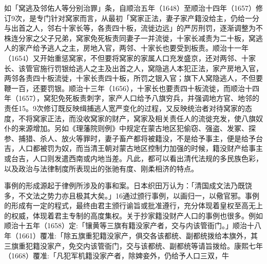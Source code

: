 \vfill
\begin{BookNotes}
\end{BookNotes}

\noindent 如「窝逃及邻佑人等分别治罪」条，自顺治五年（1648）至顺治十四年（1657）修订9次，是专门针对窝家而言，从最初「窝家正法，妻子家产籍没给主，仍给一分与出首之人，邻右十家长等，各责四十板，流徙边远」的严厉刑罚，逐渐调整为不株连分家之父子兄弟，窝家免死板责同妻子一并流徙，十家长减责为二十板，窝逃人的家产给予逃人之主，房地入官，两邻、十家长也要受到板责。顺治十一年（1654）又开始重惩窝家，不但要将窝家的家属人口充发盛京，还对两邻、十家长、该管官施行罚银给逃人之主及出首之人，窝隐逃人本犯正法，家产房地入官，两邻各责四十板流徙，十家长责四十板，所罚之银入官；旗下人窝隐逃人，不但要鞭一百，还要罚银。顺治十三年（1656），十家长也要责四十板流徙，而顺治十四年（1657），窝犯免死板责刺字，家产人口给予八旗穷兵，并强调地方官、地邻的责任15。9次修订既反映缉捕逃人宽严变化的过程，又反映统治者对待窝家的态度，不将窝家正法，而没收窝家的财产，窝家及相关责任人的流徙充发，使八旗奴仆的来源增加。另如《理藩院则例》中规定在蒙古地区犯偷窃、强盗、发冢、探参、捕猎、杀人、放火等罪时，妻子畜产都将被籍没，不是给予事主，便是给予台吉，人口都被罚为奴，而当清王朝对蒙古地区控制力加强的时候，籍没财产给事主或台吉，人口则发遣西南或内地当差。凡此，都可以看出清代法规的多民族色彩，以及政治与法律制度所表现出的张驰有度、刚柔相济的特点。

事例的形成源起于律例所涉及的事和案。日本织田万认为：「清国成文法乃既饶多，不文法之势力亦且极其大矣。」16通过颁行事例，以画归一，以儆官邪。事例的形成有一定的程式，最终由君主颁行谕旨或批准遵行，充分体现着皇权至高无上的权威，体现着君主专制的高度集权。关于抄家籍没财产人口的事例也很多。例如顺治十五年（1658）定:「镶黄等三旗有籍没家产者，交与内该管衙门。」顺治十八年（1661）覆准:「除五旗重犯籍没家产，俱交各该都统、副都统拨给本旗外，其三旗重犯籍没家产，免交内该管衙门，交与该都统、副都统等请旨拨给。康熙七年（1668）覆准:「凡犯军机籍没家产者，除婢妾外，仍给予人口三双，牛

\vfill
\begin{BookNotes}
\end{BookNotes}

